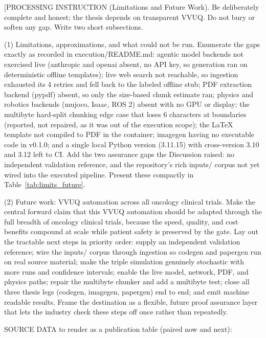 
[PROCESSING INSTRUCTION (Limitations and Future Work). Be deliberately
complete and honest; the thesis depends on transparent VVUQ. Do not bury
or soften any gap. Write two short subsections.

(1) Limitations, approximations, and what could not be run. Enumerate the
gaps exactly as recorded in execution/README.md: agentic model backends
not exercised live (anthropic and openai absent, no API key, so generation
ran on deterministic offline templates); live web search not reachable, so
ingestion exhausted its 4 retries and fell back to the labeled offline
stub; PDF extraction backend (pypdf) absent, so only the size-based chunk
estimate ran; physics and robotics backends (mujoco, Isaac, ROS 2) absent
with no GPU or display; the multibyte hard-split chunking edge case that
loses 6 characters at boundaries (reported, not repaired, as it was out of
the execution scope); the LaTeX template not compiled to PDF in the
container; imagegen having no executable code in v0.1.0; and a single local
Python version (3.11.15) with cross-version 3.10 and 3.12 left to CI. Add
the two assurance gaps the Discussion raised: no independent validation
reference, and the repository's rich inputs/ corpus not yet wired into the
executed pipeline. Present these compactly in
Table~\ref{tab:limits_future}.

(2) Future work: VVUQ automation across all oncology clinical trials. Make
the central forward claim that this VVUQ automation should be adapted
through the full breadth of oncology clinical trials, because the speed,
quality, and cost benefits compound at scale while patient safety is
preserved by the gate. Lay out the tractable next steps in priority order:
supply an independent validation reference; wire the inputs/ corpus through
ingestion so codegen and papergen run on real source material; make the
triple simulation genuinely stochastic with more runs and confidence
intervals; enable the live model, network, PDF, and physics paths; repair
the multibyte chunker and add a multibyte test; close all three thesis legs
(codegen, imagegen, papergen) end to end; and emit machine readable
results. Frame the destination as a flexible, future proof assurance layer
that lets the industry check these steps off once rather than repeatedly.

SOURCE DATA to render as a publication table (paired now and next):

